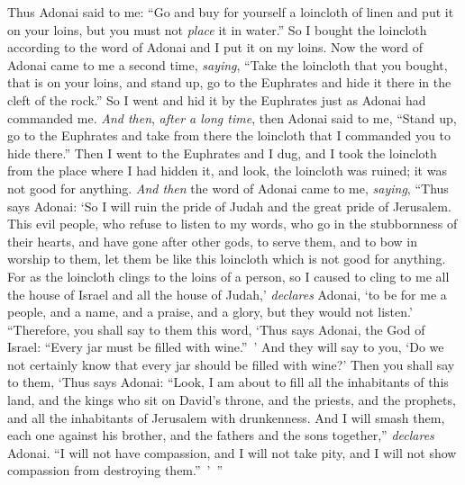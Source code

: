 \begin{biblechapter} %
 Thus Adonai said to me: “Go and buy for yourself a loincloth of linen and put it on your loins, but you must not \textit{place} it in water.”
\verse So I bought the loincloth according to the word of Adonai and I put it on my loins.
\verse Now the word of Adonai came to me a second time, \textit{saying},
\verse “Take the loincloth that you bought, that is on your loins, and stand up, go to the Euphrates and hide it there in the cleft of the rock.”
\verse So I went and hid it by the Euphrates just as Adonai had commanded me.
\verse \textit{And then}, \textit{after a long time}, then Adonai said to me, “Stand up, go to the Euphrates and take from there the loincloth that I commanded you to hide there.”
\verse Then I went to the Euphrates and I dug, and I took the loincloth from the place where I had hidden it, and look, the loincloth was ruined; it was not good for anything.
\verse \textit{And then} the word of Adonai came to me, \textit{saying},
\verse “Thus says Adonai: ‘So I will ruin the pride of Judah and the great pride of Jerusalem.
\verse This evil people, who refuse to listen to my words, who go in the stubbornness of their hearts, and have gone after other gods, to serve them, and to bow in worship to them, let them be like this loincloth which is not good for anything.
\verse For as the loincloth clings to the loins of a person, so I caused to cling to me all the house of Israel and all the house of Judah,’ \textit{declares} Adonai, ‘to be for me a people, and a name, and a praise, and a glory, but they would not listen.’
\verse “Therefore, you shall say to them this word, ‘Thus says Adonai, the God of Israel: “Every jar must be filled with wine.” ’ And they will say to you, ‘Do we not certainly know that every jar should be filled with wine?’
\verse Then you shall say to them, ‘Thus says Adonai: “Look, I am about to fill all the inhabitants of this land, and the kings who sit on David’s throne, and the priests, and the prophets, and all the inhabitants of Jerusalem with drunkenness.
\verse And I will smash them, each one against his brother, and the fathers and the sons together,” \textit{declares} Adonai. “I will not have compassion, and I will not take pity, and I will not show compassion from destroying them.” ’ ”

\end{biblechapter}
